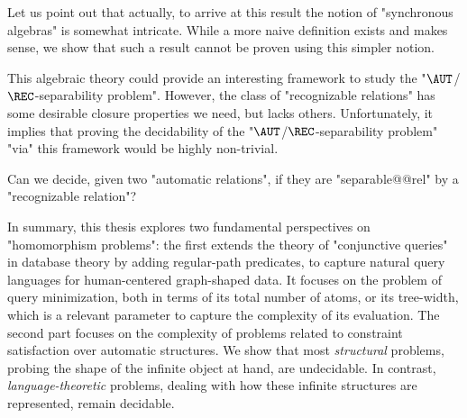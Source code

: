 Let us point out that actually, to arrive at this result the notion
of "synchronous algebras" is somewhat intricate. While a more naive definition
exists and makes sense, we show that such a result cannot be proven using this
simpler notion.

This algebraic theory could provide an interesting framework to
study the "$\AUT$/$\REC$-separability problem".
However, the class of "recognizable relations" has some desirable
closure properties we need, but lacks others.
Unfortunately, it implies that proving the decidability of
the "$\AUT$/$\REC$-separability problem" "via" this framework would
be highly non-trivial.

\begin{openproblemintro}
	Can we decide, given two "automatic relations", if they are "separable@@rel"
	by a "recognizable relation"?
\end{openproblemintro}

In summary, this thesis explores two fundamental perspectives on "homomorphism problems":
the first extends the theory of "conjunctive queries" in database theory by adding regular-path
predicates, to capture natural query languages for human-centered graph-shaped data.
It focuses on the problem of query minimization, both in terms of
its total number of atoms, or its tree-width, which is a relevant parameter to
capture the complexity of its evaluation.
The second part focuses on the complexity of problems related to constraint satisfaction
over automatic structures. We show that most \emph{structural} problems, probing the shape of the 
infinite object at hand, are undecidable. In contrast, \emph{language-theoretic} 
problems, dealing with how these infinite structures are represented, remain decidable.
